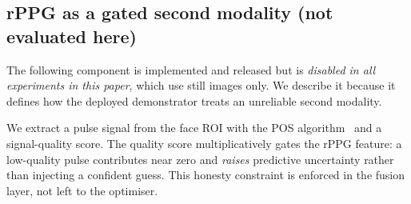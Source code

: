 \subsection{rPPG as a gated second modality (not evaluated here)}
\label{sec:rppg}
The following component is implemented and released but is \emph{disabled in all
experiments in this paper}, which use still images only. We describe it because
it defines how the deployed demonstrator treats an unreliable second modality.

We extract a pulse signal from the face ROI with the POS
algorithm~\cite{wang2017pos} and a signal-quality score. The quality score multiplicatively gates the rPPG feature:
a low-quality pulse contributes near zero and \emph{raises} predictive
uncertainty rather than injecting a confident guess. This honesty constraint is
enforced in the fusion layer, not left to the optimiser.
